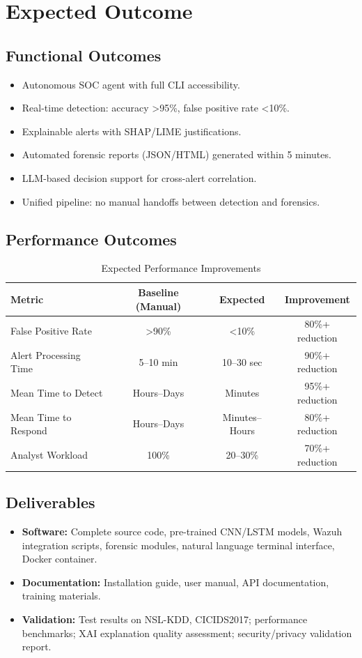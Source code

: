 \documentclass[12pt,a4paper]{report}
\newcommand{\hcell}[1]{\cellcolor{tableheader}\color{white}\textbf{#1}}
\begin{document}
\section{Expected Outcome}

\subsection{Functional Outcomes}
\begin{itemize}
    \item Autonomous SOC agent with full CLI accessibility.
    \item Real-time detection: accuracy >95\%, false positive rate <10\%.
    \item Explainable alerts with SHAP/LIME justifications.
    \item Automated forensic reports (JSON/HTML) generated within 5 minutes.
    \item LLM-based decision support for cross-alert correlation.
    \item Unified pipeline: no manual handoffs between detection and forensics.
\end{itemize}

\subsection{Performance Outcomes}
\begin{table}[H]
\centering
\caption{Expected Performance Improvements}
\begin{tabular}{@{}lccc@{}}
\toprule
\hcell{Metric} & \hcell{Baseline (Manual)} & \hcell{Expected} & \hcell{Improvement} \\
\midrule
False Positive Rate & >90\% & <10\% & 80\%+ reduction \\
Alert Processing Time & 5--10 min & 10--30 sec & 90\%+ reduction \\
Mean Time to Detect & Hours--Days & Minutes & 95\%+ reduction \\
Mean Time to Respond & Hours--Days & Minutes--Hours & 80\%+ reduction \\
Analyst Workload & 100\% & 20--30\% & 70\%+ reduction \\
\bottomrule
\end{tabular}
\end{table}

\subsection{Deliverables}
\begin{itemize}
    \item \textbf{Software:} Complete source code, pre-trained CNN/LSTM models, Wazuh integration scripts, forensic modules, natural language terminal interface, Docker container.
    \item \textbf{Documentation:} Installation guide, user manual, API documentation, training materials.
    \item \textbf{Validation:} Test results on NSL-KDD, CICIDS2017; performance benchmarks; XAI explanation quality assessment; security/privacy validation report.
\end{itemize}
\end{document}
